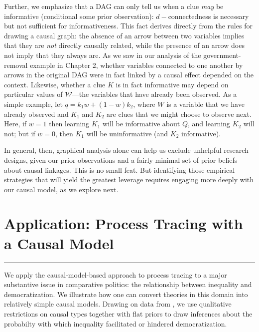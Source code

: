 \documentclass[12pt,]{book}
\begin{document}
Further, we emphasize that a DAG can only tell us when a clue \emph{may} be informative (conditional some prior observation): \(d-\)connectedness is necessary but not sufficient for informativeness. This fact derives directly from the rules for drawing a causal graph: the absence of an arrow between two variables implies that they are \emph{not} directly causally related, while the presence of an arrow does not imply that they always are. As we saw in our analysis of the government-removal example in Chapter 2, whether variables connected to one another by arrows in the original DAG were in fact linked by a causal effect depended on the context. Likewise, whether a clue \(K\) is in fact informative may depend on particular values of \(\mathcal W\)---the variables that have already been observed. As a simple example, let \(q = k_1w + (1-w)k_2\), where \(W\) is a variable that we have already observed and \(K_1\) and \(K_2\) are clues that we might choose to observe next. Here, if \(w=1\) then learning \(K_1\) will be informative about \(Q\), and learning \(K_2\) will not; but if \(w=0\), then \(K_1\) will be uninformative (and \(K_2\) informative).

In general, then, graphical analysis alone can help us exclude unhelpful research designs, given our prior observations and a fairly minimal set of prior beliefs about causal linkages. This is no small feat. But identifying those empirical strategies that will yield the greatest leverage requires engaging more deeply with our causal model, as we explore next.

\hypertarget{ptapp}{%
\chapter{Application: Process Tracing with a Causal Model}\label{ptapp}}

\begin{center}\rule{0.5\linewidth}{\linethickness}\end{center}

We apply the causal-model-based approach to process tracing to a major substantive issue in comparative politics: the relationship between inequality and democratization. We illustrate how one can convert theories in this domain into relatively simple causal models. Drawing on data from \citet{haggard2012inequality}, we use qualitative restrictions on causal types together with flat priors to draw inferences about the probabilty with which inequality facilitated or hindered democratization.
\end{document}
